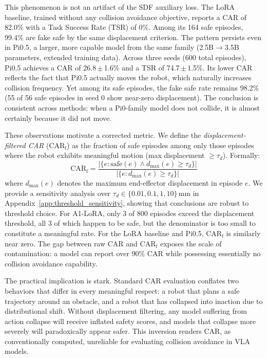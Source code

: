 This phenomenon is not an artifact of the SDF auxiliary loss. The LoRA baseline, trained without any collision avoidance objective, reports a CAR of 82.0\% with a Task Success Rate (TSR) of 0\%. Among its 164 safe episodes, 99.4\% are fake safe by the same displacement criterion. The pattern persists even in Pi0.5, a larger, more capable model from the same family (2.5B$\to$3.5B parameters, extended training data). Across three seeds (600 total episodes), Pi0.5 achieves a CAR of 26.8\,$\pm$\,1.6\% and a TSR of 74.7\,$\pm$\,1.5\%. Its lower CAR reflects the fact that Pi0.5 actually moves the robot, which naturally increases collision frequency. Yet among its safe episodes, the fake safe rate remains 98.2\% (55 of 56 safe episodes in seed 0 show near-zero displacement). The conclusion is consistent across methods: when a Pi0-family model does not collide, it is almost certainly because it did not move.

These observations motivate a corrected metric. We define the \emph{displacement-filtered CAR} (CAR$_\text{f}$) as the fraction of safe episodes among only those episodes where the robot exhibits meaningful motion (max displacement $\geq \tau_d$). Formally:
\begin{equation}
\text{CAR}_\text{f} = \frac{|\{e : \text{safe}(e) \land d_{\max}(e) \geq \tau_d\}|}{|\{e : d_{\max}(e) \geq \tau_d\}|}
\end{equation}
where $d_{\max}(e)$ denotes the maximum end-effector displacement in episode $e$. We provide a sensitivity analysis over $\tau_d \in \{0.01, 0.1, 1, 10\}$\,mm in Appendix~\ref{app:threshold_sensitivity}, showing that conclusions are robust to threshold choice. For A1-LoRA, only 3 of 800 episodes exceed the displacement threshold, all 3 of which happen to be safe, but the denominator is too small to constitute a meaningful rate. For the LoRA baseline and Pi0.5, CAR$_\text{f}$ is similarly near zero. The gap between raw CAR and CAR$_\text{f}$ exposes the scale of contamination: a model can report over 90\% CAR while possessing essentially no collision avoidance capability.

The practical implication is stark. Standard CAR evaluation conflates two behaviors that differ in every meaningful respect: a robot that plans a safe trajectory around an obstacle, and a robot that has collapsed into inaction due to distributional shift. Without displacement filtering, any model suffering from action collapse will receive inflated safety scores, and models that collapse more severely will paradoxically appear safer. This inversion renders CAR, as conventionally computed, unreliable for evaluating collision avoidance in VLA models.
